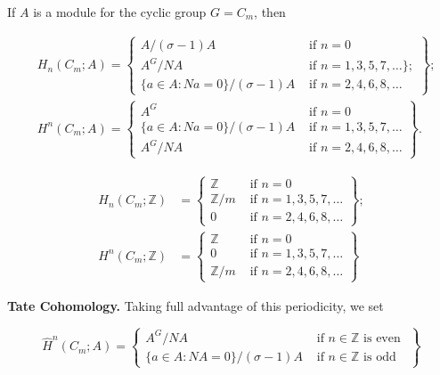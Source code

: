 \begin{theo}
    If $A$ is a module for the cyclic group $G=C_m$, then

    $$
    \begin{aligned}
    & H_n\left(C_m ; A\right)=\left\{\begin{array}{ll}
    A /(\sigma-1) A & \text { if } n=0 \\
    A^G / N A & \text { if } n=1,3,5,7, \ldots\} ; \\
    \{a \in A: N a=0\} /(\sigma-1) A & \text { if } n=2,4,6,8, \ldots
    \end{array}\right\} ; \\
    & H^n\left(C_m ; A\right)=\left\{\begin{array}{ll}
    A^G & \text { if } n=0 \\
    \{a \in A: N a=0\} /(\sigma-1) A & \text { if } n=1,3,5,7, \ldots \\
    A^G / N A & \text { if } n=2,4,6,8, \ldots
    \end{array}\right\} .
    \end{aligned}
    $$    
\end{theo}

$$\begin{aligned} H_n\left(C_m ; \mathbb{Z}\right) & =\left\{\begin{array}{ll}\mathbb{Z} & \text { if } n=0 \\ \mathbb{Z} / m & \text { if } n=1,3,5,7, \ldots \\ 0 & \text { if } n=2,4,6,8, \ldots\end{array}\right\} ; \\ H^n\left(C_m ; \mathbb{Z}\right) & =\left\{\begin{array}{ll}\mathbb{Z} & \text { if } n=0 \\ 0 & \text { if } n=1,3,5,7, \ldots \\ \mathbb{Z} / m & \text { if } n=2,4,6,8, \ldots\end{array}\right\}\end{aligned}$$

\textbf{Tate Cohomology.} Taking full advantage of this periodicity, we set

$$
\hat{H}^n\left(C_m ; A\right)=\left\{\begin{array}{ll}
A^G / N A & \text { if } n \in \mathbb{Z} \text { is even } \\
\{a \in A: N A=0\} /(\sigma-1) A & \text { if } n \in \mathbb{Z} \text { is odd }
\end{array}\right\}
$$


